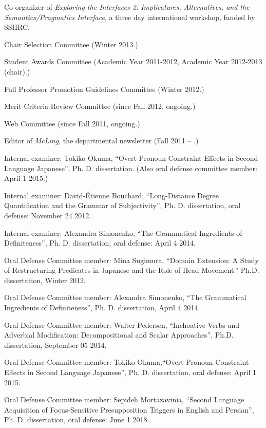 \documentclass[11pt]{article}
\begin{document}
Co-organizer of \textit{Exploring the Interfaces 2: Implicatures,
  Alternatives, and the Semantics/Pragmatics Interface}, a three day
international workshop, funded by SSHRC.

Chair Selection Committee (Winter 2013.)


Student Awards Committee (Academic Year 2011-2012, Academic Year
2012-2013 (chair).)


Full Professor Promotion Guidelines Committee (Winter 2012.)


Merit Criteria Review Committee (since Fall 2012, ongoing.)

Web Committee  (since Fall 2011, ongoing.)

Editor of \textit{McLing}, the departmental newsletter (Fall 2011 --
.)

Internal examiner:  Tokiko Okuma, ``Overt Pronoun Constraint Effects in Second Language Japanese'', Ph. D. dissertation. (Also oral defense committee member: April 1 2015.)

Internal examiner:  David-\'Etienne Bouchard, ``Long-Distance Degree Quantification and the
Grammar of Subjectivity'', Ph. D. dissertation, oral defense: November
24 2012.

Internal examiner:  Alexandra Simonenko, ``The Grammatical Ingredients
of Definiteness'', Ph. D. dissertation, oral defense: April 4 2014.

Oral Defense Committee member: Mina Sugimura, ``Domain Extension:  A Study of Restructuring
Predicates in Japanese and the Role of Head Movement.''
Ph.D. dissertation, Winter 2012. 

Oral Defense Committee member:   Alexandra Simonenko, ``The Grammatical Ingredients
of Definiteness'', Ph. D. dissertation, April 4 2014.

Oral Defense Committee member:  Walter Pedersen, ``Inchoative Verbs and Adverbial Modification: Decompositional and Scalar Approaches'', Ph.D. dissertation, September 05 2014.

Oral Defense Committee member:  Tokiko Okuma,``Overt Pronoun Constraint Effects in Second Language Japanese'', Ph. D. dissertation, oral defense: April 1 2015.

Oral Defense Committee member: Sepideh Mortazavinia, ``Second Language Acquisition of Focus-Sensitive Presupposition Triggers in English and Persian'',  Ph. D. dissertation, oral defense: June 1 2018.
\end{document}
